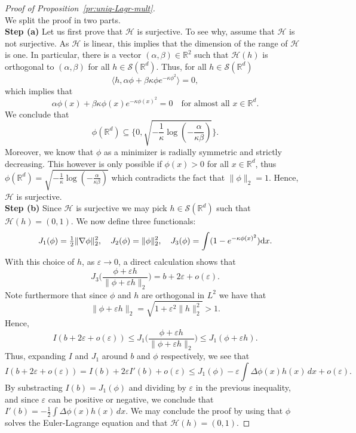\documentclass[a4paper,11pt]{amsart}
\numberwithin{equation}{section}
\newcommand{\cH}{{\ensuremath{\mathcal H}} }
\newcommand{\cS}{{\ensuremath{\mathcal S}} }
\newcommand{\gep}{\varepsilon}
\newcommand{\gk}{\kappa}
\newcommand{\dd}{\text{\rm d}}             %
\newcommand{\R}{\mathbb{R}}
\newcommand{\8}{\infty}
\begin{document}
\begin{proof}[Proof of Proposition~\ref{pr:uniq-Lagr-mult}]
\begin{equation}
	\end{equation}
	We split the proof in two parts.\\
	\textbf{Step (a)} 
	Let us first prove that $\cH$ is surjective. To see why, assume that $\cH$ is not surjective. As $\cH$ is linear, this implies that the dimension of the range of $\cH$ is one. In particular, there is a vector $(\alpha,\beta)\in\R^2$ such that $\cH(h)$ is orthogonal to $(\alpha, \beta)$ for all $h\in \cS(\R^d)$.
	Thus, for all $h\in\cS(\R^d)$
	\begin{equation}
	\langle h, \alpha \phi+ \beta\gk\phi e^{-\gk\phi^2}\rangle =0,
	\end{equation}
	which implies that
	\begin{equation}
	\alpha \phi(x)+ \beta\gk\phi(x) e^{-\gk\phi(x)^2}=0 \quad\text{for almost all }x\in \R^d.
	\end{equation}
	We conclude that
	\begin{equation}
	\phi(\R^d)\subseteq \Big\{0,\sqrt{-\frac{1}{\gk}{\log(-\frac{\alpha}{\gk\beta})}}\Big\}.
	\end{equation}
Moreover, we know that $\phi$ as a minimizer is radially symmetric and strictly decreasing. This however is only possible if $\phi(x)>0$ for all $x\in\R^d$, thus $\phi(\R^d)= \sqrt{-\frac{1}{\gk}{\log(-\frac{\alpha}{\gk\beta})}}$ which contradicts the fact that $\|\phi\|_2=1$. Hence, $\cH$ is surjective.\\
%
	\noindent
	\textbf{Step (b)} Since $\cH$ is surjective we may pick $h\in \cS(\R^d)$ such that $\cH(h) = (0,1)$. We now define three functionals:
	\begin{equation}\label{eq:J}
	J_1(\phi) = \tfrac12 \|\nabla \phi\|_2^2,\quad J_2(\phi) = \| \phi\|_2^2,\quad J_3(\phi)= \int (1-e^{-\gk \phi(x)^2}) \dd x.
	\end{equation}
	With this choice of $h$, as $\gep\to 0$, a direct calculation shows that 
	\begin{equation}\label{eq:J3}
	J_3\Big(\frac{\phi + \gep h}{\|\phi + \gep h\|_2}\Big) = b+ 2\gep + o(\gep).
	\end{equation}
	Note furthermore that since $\phi$ and $h$ are orthogonal in $L^2$ we have that 
	\begin{equation}
	\|\phi+\gep h\|_2 = \sqrt{1+\gep^2\|h\|_2^2} >1.
	\end{equation}
	Hence, 
	\begin{equation}\label{eq:J1monotone}
	I(b+2\gep+o(\gep))\leq J_1\Big(\frac{\phi + \gep h}{\|\phi + \gep h\|_2}\Big) \leq J_1(\phi+\gep h).
	\end{equation}
	Thus, expanding $I$ and $J_1$ around $b$ and $\phi$ respectively, we see that
	\begin{equation}
	I(b+2\gep + o(\gep))= I(b) +2\gep I'(b) + o(\gep)\leq J_1(\phi)- \gep \int \Delta \phi(x)h(x)\, dx + o(\gep). 
	\end{equation}
	By substracting $I(b) = J_1(\phi)$ and dividing by $\gep$ in the previous inequality, and since $\gep$ can be positive or negative, we conclude that
	$I'(b) = - \tfrac12\int \Delta \phi(x) h(x)\, dx$. We may conclude the proof by using that $\phi$ solves the Euler-Lagrange equation and that $\cH(h)=(0,1)$.
\end{proof}
\end{document}
